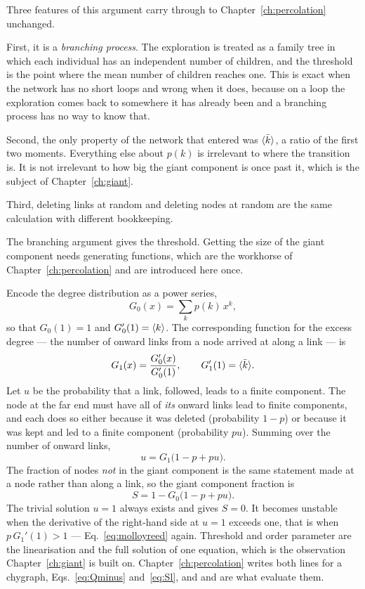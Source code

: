 Three features of this argument carry through to
Chapter~\ref{ch:percolation} unchanged.

First, it is a \emph{branching process}. The exploration is treated as a family
tree in which each individual has an independent number of children, and the
threshold is the point where the mean number of children reaches one. This is
exact when the network has no short loops and wrong when it does, because on a
loop the exploration comes back to somewhere it has already been and a branching
process has no way to know that.

Second, the only property of the network that entered was $\langle \bar k \rangle$, a
ratio of the first two moments. Everything else about $p(k)$ is irrelevant to
where the transition is. It is not irrelevant to how big the giant component is
once past it, which is the subject of Chapter~\ref{ch:giant}.

Third, deleting links at random and deleting nodes at random are the same
calculation with different bookkeeping.

The branching argument gives the threshold. Getting the size of the giant
component needs generating functions, which are the workhorse of
Chapter~\ref{ch:percolation} and are introduced here once.

Encode the degree distribution as a power series,
\[
  G_{0}(x)=\sum_{k}p(k)\,x^{k},
\]
so that $G_{0}(1)=1$ and $G_{0}'(1)=\langle k \rangle$. The corresponding function for the
excess degree --- the number of onward links from a node arrived at along a link
--- is
\[
  G_{1}(x)=\frac{G_{0}'(x)}{G_{0}'(1)},
  \qquad G_{1}'(1)=\langle \bar k \rangle.
\]
Let $u$ be the probability that a link, followed, leads to a finite component.
The node at the far end must have all of \emph{its} onward links lead to finite
components, and each does so either because it was deleted (probability $1-p$)
or because it was kept and led to a finite component (probability $pu$). Summing
over the number of onward links,
\[
  u=G_{1}\bigl(1-p+pu\bigr).
\]
The fraction of nodes \emph{not} in the giant component is the same statement
made at a node rather than along a link, so the giant component fraction is
\[
  S=1-G_{0}\bigl(1-p+pu\bigr).
\]
The trivial solution $u=1$ always exists and gives $S=0$. It becomes unstable
when the derivative of the right-hand side at $u=1$ exceeds one, that is when
$p\,G_{1}'(1)>1$ --- Eq.~\eqref{eq:molloyreed} again. Threshold and order
parameter are the linearisation and the full solution of one equation, which is
the observation Chapter~\ref{ch:giant} is built on. Chapter~\ref{ch:percolation} writes both lines for a chygraph, Eqs.~\eqref{eq:Qminus} and~\eqref{eq:Sl}, and  and  are what evaluate them.

